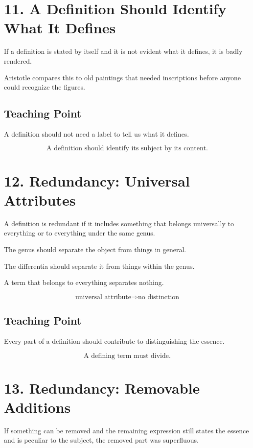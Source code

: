 \documentclass[12pt]{article}
\begin{document}
\section*{11. A Definition Should Identify What It Defines}

If a definition is stated by itself and it is not evident what it defines, it is
badly rendered.

Aristotle compares this to old paintings that needed inscriptions before anyone
could recognize the figures.

\subsection*{Teaching Point}

A definition should not need a label to tell us what it defines.

\[
\boxed{
\text{A definition should identify its subject by its content.}
}
\]

\section*{12. Redundancy: Universal Attributes}

A definition is redundant if it includes something that belongs universally to
everything or to everything under the same genus.

The genus should separate the object from things in general.

The differentia should separate it from things within the genus.

A term that belongs to everything separates nothing.

\[
\text{universal attribute} \Rightarrow \text{no distinction}
\]

\subsection*{Teaching Point}

Every part of a definition should contribute to distinguishing the essence.

\[
\boxed{
\text{A defining term must divide.}
}
\]

\section*{13. Redundancy: Removable Additions}

If something can be removed and the remaining expression still states the
essence and is peculiar to the subject, the removed part was superfluous.
\end{document}
